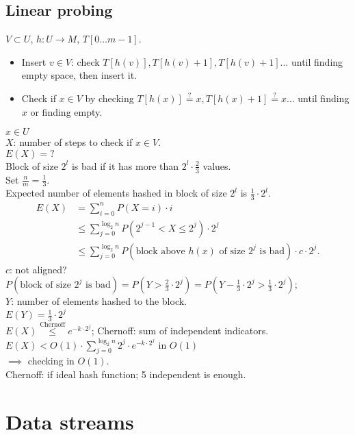 \documentclass[a4paper, 12pt]{book}
\theoremstyle{definition}
\theoremstyle{remark}
\begin{document}
\section{Linear probing}

$V \subset U$, $h: U \to M$, $T[0 \dots m-1]$.
\begin{itemize}
  \item Insert $v \in V$: check $T[h(v)], T[h(v)+1], T[h(v)+1] \dots$ until finding empty space,
    then insert it.
  \item Check if $x \in V$ by checking $T[h(x)] \stackrel{?}{=} x, T[h(x)+1] \stackrel{?}{=} x \dots$
    until finding $x$ or finding empty.
\end{itemize}
$x \in U$ \\
$X$: number of steps to check if $x \in V$. \\
$E(X) = ?$ \\
Block of size $2^l$ is bad if it has more than $2^l \cdot \frac{2}{3}$ values. \\
Set $\frac{n}{m} = \frac{1}{3}$. \\
Expected number of elements hashed in block of size $2^l$ is $\frac{1}{3} \cdot 2^l$. \\
\begin{align*}
  E(X) &= \sum_{i=0}^{n} P(X = i) \cdot i \\
  &\leq \sum_{j=0}^{\log_2 n} P(2^{j-1} < X \leq 2^j) \cdot 2^j \\
  &\leq \sum_{j=0}^{\log_2 n} P(\text{block above $h(x)$ of size $2^j$ is bad}) \cdot c \cdot 2^j.
\end{align*}
$c$: not aligned? \\
$P(\text{block of size $2^j$ is bad}) = P(Y > \frac{2}{3} \cdot 2^j) =
P(Y - \frac{1}{3} \cdot 2^j > \frac{1}{3} \cdot 2^j)$; \\
$Y$: number of elements hashed to the block. \\
$E(Y) = \frac{1}{3} \cdot 2^j$ \\
$E(X) \stackrel{\text{Chernoff}}{\leq} e^{-k \cdot 2^j}$; Chernoff: sum of independent indicators. \\
$E(X) < O(1) \cdot \sum_{j=0}^{\log_2 n} 2^j \cdot e^{-k \cdot 2^j}$ in $O(1)$ \\
$\implies$ checking in $O(1)$. \\
Chernoff: if ideal hash function; 5 independent is enough.


\chapter{Data streams}
\end{document}
